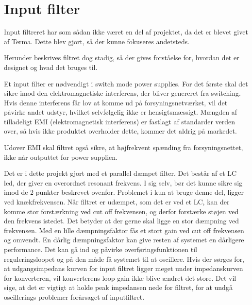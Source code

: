 \section{Input filter}
Input filtreret har som sådan ikke været en del af projektet, da det er blevet givet af Terma. Dette blev gjort, så der kunne fokuseres andetsteds. 

\noindent Herunder beskrives filtret dog stadig, så der gives forståelse for, hvordan det er designet og hvad det bruges til.

\noindent \cite{Inputfilter} Et input filter er nødvendigt i switch mode power supplies. For det første skal det sikre imod den elektromagnetiske interferens, der bliver genereret fra switching. Hvis denne interferens får lov at komme ud på forsyningsnetværket, vil det påvirke andet udstyr, hvilket selvfølgelig ikke er hensigtsmæssigt. Mængden af  tilladeligt EMI (elektromagnetisk interferens) er fastlagt af standarder verden over, så hvis ikke produktet overholder dette, kommer det aldrig på markedet.

\noindent Udover EMI skal filtret også sikre, at højfrekvent spænding fra forsyningsnettet, ikke når outputtet for power supplien. 

Det er i dette projekt gjort med et parallel dæmpet filter. Det består af et LC led, der giver en overordnet resonant frekvens. I sig selv, bør det kunne sikre sig imod de 2 punkter beskrevet ovenfor. Problemet i kun at bruge denne del, ligger ved knækfrekvensen. Når filtret er udæmpet, som det er ved et LC, kan der komme stor forstærkning ved cut off frekvensen, og derfor forstærke støjen ved den frekvens istedet. Det betyder at der gerne skal ligge en stor dæmpning ved frekvensen. Med en lille dæmpningsfaktor fås et stort gain ved cut off frekvensen og omvendt. En dårlig dæmpningsfaktor kan give resten af systemet en dårligere performance. Det kan gå ind og påvirke overføringsfunktionen til reguleringsloopet og på den måde få systemet til at oscillere. Hvis der sørges for, at udgangsimpedans kurven for input filtret ligger meget under impedanskurven for konverteren, vil konverterens loop gain ikke blive ændret det store. Det vil sige, at det er vigtigt at holde peak impedansen nede for filtret, for at undgå oscillerings problemer forårsaget af inputfiltret.     

